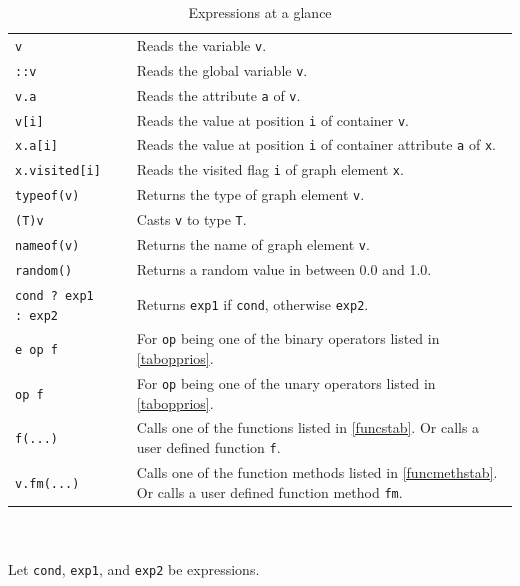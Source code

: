 \begin{table}[htbp]
\begin{minipage}{\linewidth} \renewcommand{\footnoterule}{} 
\begin{tabularx}{\linewidth}{|lX|}
\hline
\texttt{v}	& Reads the variable \texttt{v}. \\
\texttt{::v}	& Reads the global variable \texttt{v}. \\
\texttt{v.a} & Reads the attribute \texttt{a} of \texttt{v}.\\
\texttt{v[i]} & Reads the value at position \texttt{i} of container \texttt{v}.\\
\texttt{x.a[i]} & Reads the value at position \texttt{i} of container attribute \texttt{a} of \texttt{x}.\\
\texttt{x.visited[i]} & Reads the visited flag \texttt{i} of graph element \texttt{x}.\\
\hline
\texttt{typeof(v)}	& Returns the type of graph element \texttt{v}. \\
\texttt{(T)v}	& Casts \texttt{v} to type \texttt{T}. \\
\texttt{nameof(v)}	& Returns the name of graph element \texttt{v}. \\
\texttt{random()}	& Returns a random value in between 0.0 and 1.0. \\
\hline
\texttt{cond ? exp1 :~exp2}	& Returns \texttt{exp1} if \texttt{cond}, otherwise \texttt{exp2}. \\
\texttt{e op f}	& For \texttt{op} being one of the binary operators listed in \ref{tabopprios}. \\
\texttt{op f}	& For \texttt{op} being one of the unary operators listed in \ref{tabopprios}. \\
\hline
\texttt{f(...)}	& Calls one of the functions listed in \ref{funcstab}. Or calls a user defined function \texttt{f}. \\
\texttt{v.fm(...)}	& Calls one of the function methods listed in \ref{funcmethstab}. Or calls a user defined function method \texttt{fm}.\\
\hline
\end{tabularx}
\end{minipage}\\
\\ 
{\small Let \texttt{cond}, \texttt{exp1}, and \texttt{exp2} be expressions.}
\caption{Expressions at a glance}
\label{expressionstab}
\end{table}

